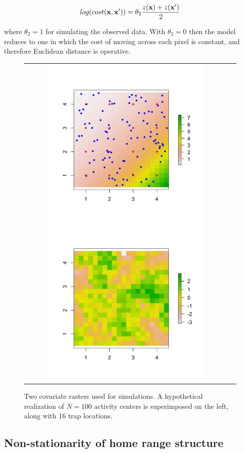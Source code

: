 \[
 log(cost({\bf x},{\bf x}'))=  \theta_2 \frac{z({\bf x}) + z({\bf x}')}{2}
\]

{\flushleft where} $\theta_2 = 1$ for simulating the observed data.
 With $\theta_2=0$ then the
model reduces to one in which the cost of moving across each pixel is
constant, and therefore Euclidean distance is operative.

\begin{figure}
\begin{tabular}{cc}
\includegraphics[height=3.25in,width=3.25in]{Ch10/figs/raster_withN100}
\includegraphics[height=3.25in,width=3.25in]{Ch10/figs/raster_krige} &
\end{tabular}
\caption{Two covariate rasters used for simulations. A hypothetical
  realization of $N=100$ activity centers is superimposed on the left,
along with 16 trap locations. }
\label{ecoldist.fig.raster100}
\end{figure}

\subsection{Non-stationarity of home range structure}

